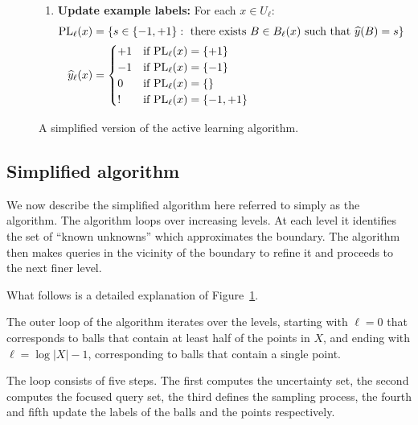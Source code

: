 \documentclass[twoside]{article}
\def\yh{{\widehat{y}}}
\def\PL{{\mbox{\rm PL}}}
\begin{document}
\begin{figure}[t]
{\begin{minipage}[t]{6in}
\begin{center}
\begin{enumerate}[leftmargin=0.6cm]
\item \label{step:examples} {\bf Update example labels:} For each $x \in U_\ell$:
  \begin{align}
    \PL_\ell(x) &= \{s \in \{-1, +1\}: \ \text{there exists } B \in B_\ell(x) \text{ such that } \yh(B) = s \} \\ 
    \yh_\ell(x) &= 
                  \begin{cases}
                    +1 & \text{if } \PL_\ell(x) = \{+1\} \\
                    -1 & \text{if } \PL_\ell(x) = \{-1\} \\
                    0  & \text{if } \PL_\ell(x) = \{\} \\
                    !  & \text{if } \PL_\ell(x) = \{-1,+1\}
                  \end{cases}
                  \label{eq:provisional-label}
  \end{align}
\end{enumerate}
\end{center}

\end{minipage}}
\caption{A simplified version of the active learning algorithm.}
\label{alg:simple}
\end{figure}

\subsection{Simplified algorithm}

We now describe the simplified algorithm here referred to simply as
the algorithm. The algorithm loops over increasing levels.  At each
level it identifies the set of ``known unknowns'' which approximates
the boundary. The algorithm then makes queries in the vicinity of the
boundary to refine it and proceeds to the next finer level.

What follows is a detailed explanation of  Figure~\ref{alg:simple}.

The outer loop of the algorithm iterates over the
levels, starting with $\ell=0$ that corresponds to balls that contain
at least half of the points in $X$, and ending with $\ell=\log |X|-1$,
corresponding to balls that contain a single point.

The loop consists of five steps. The first computes the uncertainty set, the second computes the focused query
set, the third defines the sampling process, the fourth and fifth
update the labels of the balls and the points respectively.
\end{document}
